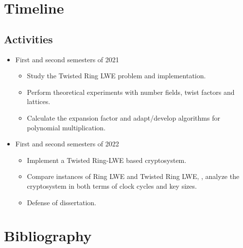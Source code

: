 \documentclass[a4paper,12pt]{article}
\begin{document}
\section{Timeline}
\label{timeline}
\subsection{Activities}
\label{sec:org8c1c6e0}
\begin{itemize}
\item First and second semesters of 2021
\begin{itemize}
\item Study the Twisted Ring LWE problem and implementation.
\item Perform theoretical experiments with number fields, twist factors and lattices.
\item Calculate the expansion factor and adapt/develop algorithms for polynomial multiplication.
\end{itemize}
\item First and second semesters of 2022
\begin{itemize}
\item Implement a Twisted Ring-LWE based cryptosystem.
\item Compare instances of Ring LWE and Twisted Ring LWE, \ie, analyze the cryptosystem in both terms of clock cycles and key sizes.
\item Defense of dissertation.
\end{itemize}
\end{itemize}

\section*{Bibliography}
\label{bibliography}


\end{document}
